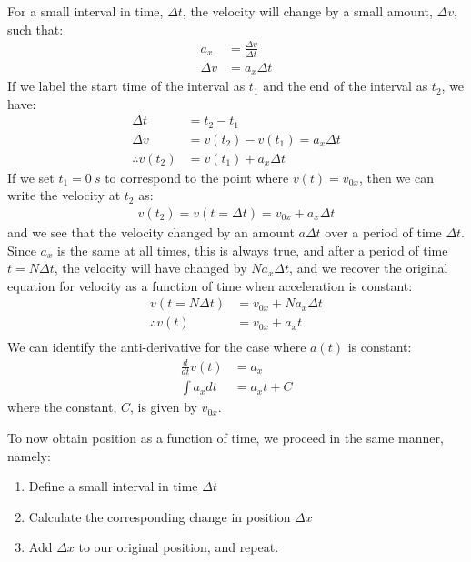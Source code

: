 For a small interval in time, $\Delta t$, the velocity will change by a small amount, $\Delta v$, such that:
\begin{align*}
a_x &= \frac{\Delta v}{\Delta t}\\
\Delta v &= a_x \Delta t
\end{align*}
If we label the start time of the interval as $t_1$ and the end of the interval as $t_2$, we have:
\begin{align*}
\Delta t &= t_2 - t_1 \\
\Delta v &= v(t_2) - v(t_1) = a_x \Delta t\\
\therefore v(t_2) &= v(t_1)+a_x\Delta t
\end{align*}
If we set $t_1=\SI{0}{s}$ to correspond to the point where $v(t)=v_{0x}$, then we can write the velocity at $t_2$ as:
\begin{align*}
v(t_2) = v(t=\Delta t) = v_{0x}+a_x\Delta t
\end{align*}
and we see that the velocity changed by an amount $a \Delta t$ over a period of time $\Delta t$. Since $a_x$ is the same at all times, this is always true, and after a period of time $t = N\Delta t$, the velocity will have changed by $N a_x \Delta t$, and we recover the original equation for velocity as a function of time when acceleration is constant:
\begin{align*}
v(t=N \Delta t) &= v_{0x}+Na_x\Delta t\\
\therefore v(t) &= v_{0x}+a_xt\\
\end{align*}
We can identify the anti-derivative for the case where $a(t)$ is constant:
\begin{align*}
\frac{d}{dt} v(t) &=a_x\\
\int a_x dt &=a_xt +C
\end{align*}
where the constant, $C$, is given by $v_{0x}$.

To now obtain position as a function of time, we proceed in the same manner, namely:
\begin{enumerate}
\item Define a small interval in time $\Delta t$
\item Calculate the corresponding change in position $\Delta x$
\item Add $\Delta x$ to our original position, and repeat.
\end{enumerate}

